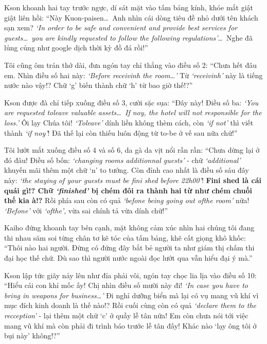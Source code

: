 \documentclass[../main.tex]{subfiles}
\begin{document}
Kson khoanh hai tay trước ngực, dí sát mặt vào tấm bảng kính, khóe mắt giật giật liên hồi: ``Này Kuon-paisen\dots\ Anh nhìn cái dòng tiêu đề nhỏ dưới tên khách sạn xem? \textit{`In order to be safe and convenient and provide best services for guests\dots\ you are kindly requested to follow the following regulations'}\dots\ Nghe đã lủng củng như google dịch thời kỳ đồ đá rồi!''

Tôi cũng ôm trán thở dài, đưa ngón tay chỉ thẳng vào điều số 2: ``Chưa hết đâu em. Nhìn điều số hai này: \textit{`Before receivinh the room\dots'} Từ \textit{`receivinh'} này là tiếng nước nào vậy!? Chữ `g' biến thành chữ `h' từ bao giờ thế!?''

Kson được đà chỉ tiếp xuống điều số 3, cười sặc sụa: ``Đây này! Điều số ba: \textit{`You are requested toleave valuable assets\dots\ If noy, the hotel will not responsible for the loss.'} Ôi lạy Chúa tôi! \textit{`Toleave'} dính liền không thèm cách, còn \textit{`if not'} thì viết thành \textit{`if noy'}! Đã thế lại còn thiếu luôn động từ to-be ở vế sau nữa chứ!''

Tôi lướt mắt xuống điều số 4 và số 6, da gà da vịt nổi rần rần: ``Chưa dừng lại ở đó đâu! Điều số bốn: \textit{`changing rooms additionnal guests'} - chữ \textit{`additional'} khuyến mãi thêm một chữ `n' to tướng. Còn đỉnh cao nhất là điều số sáu đây này: \textit{`the staying of your guests must be fini shed before 22h00'}! \textbf{Fini shed là cái quái gì!? Chữ \textit{`finished'} bị chém đôi ra thành hai từ như chém chuối thế kia à!?} Rồi phía sau còn có quả \textit{`befone being going out ofthe room'} nữa! \textit{`Befone'} với \textit{`ofthe'}, vừa sai chính tả vừa dính chữ!''

Kaiho đứng khoanh tay bên cạnh, mặt không cảm xúc nhìn hai chúng tôi đang thi nhau săm soi từng chân tơ kẽ tóc của tấm bảng, khẽ cất giọng khô khốc: ``Thôi nào hai người. Đừng có đứng đây bắt bẻ người ta như giám thị chấm thi đại học thế chứ. Dù sao thì người nước ngoài đọc lướt qua vẫn hiểu đại ý mà.''

Kson lập tức giãy nảy lên như đỉa phải vôi, ngón tay chọc lia lịa vào điều số 10: ``Hiểu cái con khỉ mốc ấy! Chị nhìn điều số mười này đi! \textit{`In case you have to bring in weapons for business\dots'} Đi nghỉ dưỡng biển mà lại có vụ mang vũ khí vì mục đích kinh doanh là thế nào!? Rồi cuối cùng còn có quả \textit{`declare them to the recception'} - lại thêm một chữ `c' ở quầy lễ tân nữa! Em còn chưa nói tới việc mang vũ khí mà còn phải đi trình báo trước lễ tân đấy! Khác nào `lạy ông tôi ở bụi này' không!?''
\end{document}
